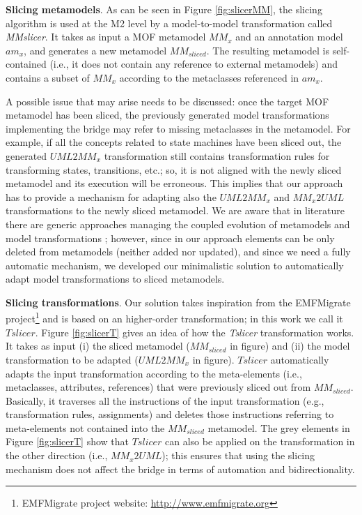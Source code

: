 \textbf{Slicing metamodels}. As can be seen in Figure \ref{fig:slicerMM}, the slicing algorithm is used at the M2 level by a model-to-model transformation called \textit{MMslicer}.
It takes as input a MOF metamodel $MM_x$ and an annotation model $am_x$, and generates a new metamodel $MM_{sliced}$.
The resulting metamodel is self-contained (i.e., it does not contain any reference to external metamodels)
and contains a subset of $MM_x$ according to the metaclasses referenced in $am_x$.

A possible issue that may arise needs to be discussed: once the target MOF metamodel has been sliced, the
previously generated model transformations implementing the bridge may refer to missing metaclasses in the metamodel.
For example, if all the concepts related to state machines have been sliced out, the generated $UML2MM_x$ transformation still contains
transformation rules for transforming states, transitions, etc.; so, it is not aligned with the newly sliced metamodel and its execution will be erroneous.
This implies that our approach has to provide a mechanism for adapting also the $UML2MM_x$ and $MM_x2UML$ transformations
to the newly sliced metamodel.
We are aware that in literature there are generic approaches managing the coupled evolution of metamodels and model transformations
\cite{TransEvolution}; however, since in our approach elements
can be only deleted from metamodels (neither added nor updated), and since we need a fully automatic mechanism, we developed our minimalistic solution to automatically adapt model transformations to sliced metamodels.

\textbf{Slicing transformations}.
Our solution takes inspiration from the EMFMigrate project\footnote{EMFMigrate project website: \small{\url{http://www.emfmigrate.org}}}
and is based on an higher-order transformation; in this work we call it $Tslicer$.
Figure \ref{fig:slicerT} gives an idea of how the \textit{Tslicer} transformation works. It takes as input (i) the sliced metamodel
($MM_{sliced}$ in figure) and (ii) the model transformation to be adapted ($UML2MM_x$ in figure). $Tslicer$ automatically adapts the input transformation according to the meta-elements (i.e., metaclasses, attributes, references) that were previously sliced out from $MM_{sliced}$.
Basically, it traverses all the instructions of the input transformation (e.g., transformation rules, assignments)
and deletes those instructions referring to meta-elements not contained into the $MM_{sliced}$ metamodel.
The grey elements in Figure \ref{fig:slicerT} show that $Tslicer$ can also be
applied on the transformation in the other direction (i.e., $MM_x2UML$); this ensures that using the slicing mechanism does not affect
the bridge in terms of automation and bidirectionality.

